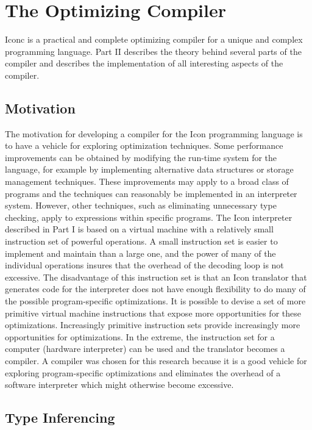 \chapter{The Optimizing Compiler}

Iconc is a practical and complete optimizing compiler for a unique and
complex programming language. Part II describes the theory behind
several parts of the compiler and describes the implementation of all
interesting aspects of the compiler.

\section{Motivation}


The motivation for developing a compiler for the Icon programming
language is to have a vehicle for exploring optimization
techniques. Some performance improvements can be obtained by modifying
the run-time system for the language, for example by implementing
alternative data structures or storage management techniques. These
improvements may apply to a broad class of programs and the techniques
can reasonably be implemented in an interpreter system.  However,
other techniques, such as eliminating unnecessary type checking, apply
to expressions within specific programs. The Icon interpreter
described in Part I is based on a virtual machine with a relatively
small instruction set of powerful operations. A small instruction set
is easier to implement and maintain than a large one, and the power of
many of the individual operations insures that the overhead of the
decoding loop is not excessive. The disadvantage of this instruction
set is that an Icon translator that generates code for the interpreter
does not have enough flexibility to do many of the possible
program-specific optimizations. It is possible to devise a set of more
primitive virtual machine instructions that expose more opportunities
for these optimizations. Increasingly primitive instruction sets
provide increasingly more opportunities for optimizations. In the
extreme, the instruction set for a computer (hardware interpreter) can
be used and the translator becomes a compiler. A compiler was chosen
for this research because it is a good vehicle for exploring
program-specific optimizations and eliminates the overhead of a
software interpreter which might otherwise become excessive.

\section{Type Inferencing}

